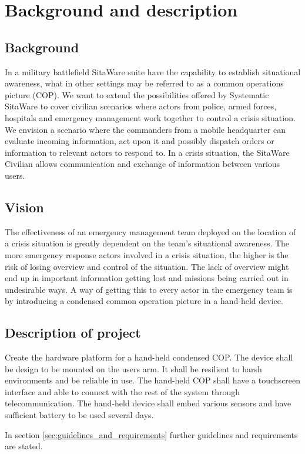 \chapter{Background and description}
\section{Background}
In a military battlefield SitaWare suite have the capability to establish situational awareness, what
in other settings may be referred to as a common operations picture (COP). We want to
extend the possibilities offered by Systematic SitaWare to cover civilian scenarios where
actors from police, armed forces, hospitals and emergency management work together to
control a crisis situation. We envision a scenario where the commanders from a mobile
headquarter can evaluate incoming information, act upon it and possibly dispatch orders
or information to relevant actors to respond to.
In a crisis situation, the SitaWare Civilian allows communication and exchange of information between various users. 

\section{Vision}
The effectiveness of an emergency management team deployed on the location of a crisis
situation is greatly dependent on the team’s situational awareness. The more emergency
response actors involved in a crisis situation, the higher is the risk of losing overview and
control of the situation. The lack of overview might end up in important information
getting lost and missions being carried out in undesirable ways.
A way of getting this to every actor in the emergency team is by introducing a condensed common operation picture in a hand-held device. 

\section{Description of project}
Create the hardware platform for a hand-held condensed COP. The device shall be design to be mounted on the users arm. It shall be resilient to harsh environments and be reliable in use. The hand-held COP shall have a touchscreen interface and able to connect with the rest of the system through telecommunication.
The hand-held device shall embed various sensors and have sufficient battery to be used several days. 

In section \ref{sec:guidelines_and_requirements} further guidelines and requirements are stated. 


